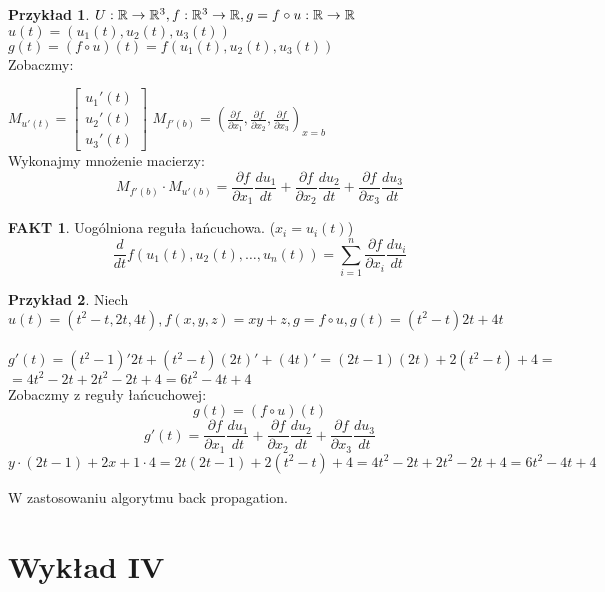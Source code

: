 \documentclass{article}
\theoremstyle{definition}
\theoremstyle{definition}
\theoremstyle{definition}
\newtheorem{pk}{Przykład}[subsection]
\theoremstyle{definition}
\theoremstyle{definition}
\theoremstyle{definition}
\theoremstyle{definition}
\newtheorem*{fakt}{FAKT}
\begin{document}
\begin{pk}
    $U: \mathbb{R} \rightarrow \mathbb{R}^3, f: \mathbb{R}^3 \rightarrow \mathbb{R}, g=f\circ u : \mathbb{R} \rightarrow \mathbb{R}\\$
    $u(t) = \left(u_1 (t), u_2 (t), u_3 (t)\right)$\\
    $g(t) = (f\circ u) (t) = f(u_1(t),u_2(t),u_3(t))$\\
    Zobaczmy:

    $M_{u'(t)} = \begin{bmatrix}
        u_1'(t) \\
        u_2'(t) \\
        u_3'(t)
    \end{bmatrix}  
    $
    $M_{f'(b)} = \left(\frac{\partial f}{\partial x_1}, \frac{\partial f}{\partial x_2}, \frac{\partial f}{\partial x_3}\right)_{x=b}$\\
    Wykonajmy mnożenie macierzy:
    \[M_{f'(b)}\cdot M_{u'(b)} = \frac{\partial f}{\partial x_1} \frac{d u_1}{dt} + \frac{\partial f}{\partial x_2} \frac{d u_2}{dt} + \frac{\partial f}{\partial x_3} \frac{d u_3}{dt}\]
\end{pk}

\begin{fakt}
    Uogólniona reguła łańcuchowa. ($x_i = u_i(t)$)
    \[\frac{d}{dt} f\left(u_1(t), u_2(t), \dots, u_n(t)\right) = \sum_{i=1}^{n} \frac{\partial f}{\partial x_i} \frac{d u_i}{dt}\]
\end{fakt}

\begin{pk}
    Niech $u(t) = (t^2-t, 2t, 4t), f(x,y,z)=xy+z, g=f\circ u, g(t)=(t^2-t)2t+4t$\\\\
    $g'(t) = (t^2-1)'2t + (t^2-t)(2t)' + (4t)' = (2t-1)(2t) + 2(t^2-t) + 4=$\\
    $= 4t^2 - 2t + 2t^2 - 2t + 4 = 6t^2 - 4t + 4$\\
    Zobaczmy z reguły łańcuchowej:\\
    \[g(t)=(f\circ u)(t)\]
    \[g'(t)=\frac{\partial f}{\partial x_1} \frac{du_1}{dt} + \frac{\partial f}{\partial x_2} \frac{du_2}{dt} + \frac{\partial f}{\partial x_3} \frac{du_3}{dt}\]
    \[y\cdot (2t-1) + 2x + 1\cdot 4 = 2t (2t-1) + 2(t^2-t) + 4 = 4t^2 - 2t + 2t^2 - 2t + 4 = 6t^2 - 4t + 4\]
\end{pk}
W zastosowaniu algorytmu back propagation.

\section{Wykład IV}
\end{document}
